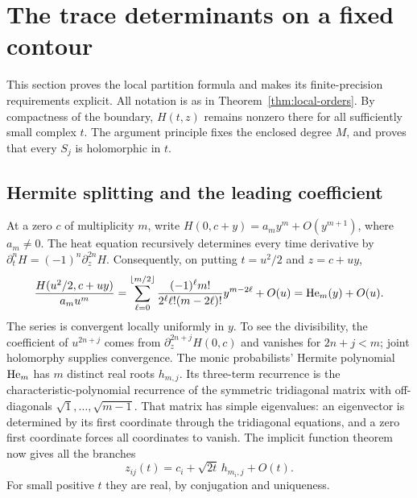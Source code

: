\section{The trace determinants on a fixed contour}\label{sec:local}
This section proves the local partition formula and makes its finite-precision requirements explicit. All notation is as in Theorem~\ref{thm:local-orders}. By compactness of the boundary, $H(t,z)$ remains nonzero there for all sufficiently small complex $t$. The argument principle fixes the enclosed degree $M$, and proves that every $S_j$ is holomorphic in $t$.

\subsection{Hermite splitting and the leading coefficient}
At a zero $c$ of multiplicity $m$, write $H(0,c+y)=a_my^m+O(y^{m+1})$, where $a_m\ne0$. The heat equation recursively determines every time derivative by $\partial_t^nH=(-1)^n\partial_z^{2n}H$. Consequently, on putting $t=u^2/2$ and $z=c+uy$,
\[
 \frac{H(u^2/2,c+uy)}{a_mu^m}
 =\sum_{\ell=0}^{\lfloor m/2\rfloor}
 \frac{(-1)^\ell m!}{2^\ell\ell!(m-2\ell)!}y^{m-2\ell}+O(u)
 =\operatorname{He}_m(y)+O(u).
\]
The series is convergent locally uniformly in $y$. To see the divisibility, the coefficient of $u^{2n+j}$ comes from $\partial_z^{2n+j}H(0,c)$ and vanishes for $2n+j<m$; joint holomorphy supplies convergence. The monic probabilists' Hermite polynomial $\operatorname{He}_m$ has $m$ distinct real roots $h_{m,j}$. Its three-term recurrence is the characteristic-polynomial recurrence of the symmetric tridiagonal matrix with off-diagonals $\sqrt1,\ldots,\sqrt{m-1}$. That matrix has simple eigenvalues: an eigenvector is determined by its first coordinate through the tridiagonal equations, and a zero first coordinate forces all coordinates to vanish. The implicit function theorem now gives all the branches
\[
 z_{ij}(t)=c_i+\sqrt{2t}\,h_{m_i,j}+O(t).
\]
For small positive $t$ they are real, by conjugation and uniqueness.

